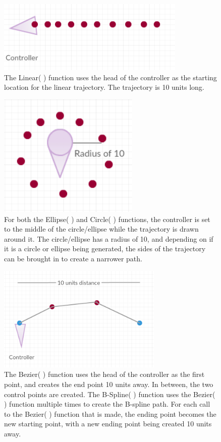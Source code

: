 \documentclass[draftclsnofoot,onecolumn,compsoc]{IEEEtran}
\begin{document}
\begin{figure}[H]
  \centering
    \includegraphics[width=0.8\textwidth]{linear}
    \caption{The Linear( ) function uses the head of the controller as the starting location for the linear trajectory. The trajectory is 10 units long. }
\end{figure}

\begin{figure}[H]
  \centering
    \includegraphics[width=0.6\textwidth]{ellipse}
    \caption{For both the Ellipse( ) and Circle( ) functions, the controller is set to the middle of the circle/ellipse while the trajectory is drawn around it. The circle/ellipse has a radius of 10, and depending on if it is a circle or ellipse being generated, the sides of the trajectory can be brought in to create a narrower path. }
\end{figure}

\begin{figure}[H]
  \centering
    \includegraphics[width=0.7\textwidth]{bezier}
    \caption{The Bezier( ) function uses the head of the controller as the first point, and creates the end point 10 units away. In between, the two control points are created. The B-Spline( ) function uses the Bezier( ) function multiple times to create the B-spline path. For each call to the Bezier( ) function that is made, the ending point becomes the new starting point, with a new ending point being created 10 units away. }
\end{figure}
\newpage
\end{document}
